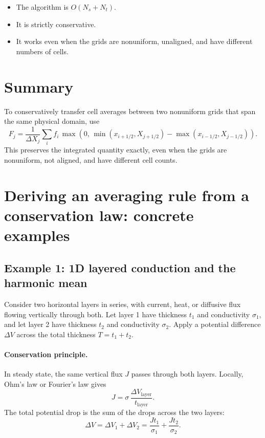 \documentclass[a4paper,10pt]{article}
\begin{document}
\begin{itemize}
\item The algorithm is $O(N_s + N_t)$.
\item It is strictly conservative.
\item It works even when the grids are nonuniform, unaligned, and have different numbers of cells.
\end{itemize}

\section{Summary}

To conservatively transfer cell averages between two nonuniform grids that span the same physical domain, use
\begin{equation}
F_j = \frac{1}{\Delta X_j} \sum_i f_i\, \max\!\left(0,\, \min(x_{i+1/2},X_{j+1/2}) - \max(x_{i-1/2},X_{j-1/2})\right).
\end{equation}
This preserves the integrated quantity exactly, even when the grids are nonuniform, not aligned, and have different cell counts.

\section{Deriving an averaging rule from a conservation law: concrete examples}

\subsection{Example 1: 1D layered conduction and the harmonic mean}

Consider two horizontal layers in series, with current, heat, or diffusive flux flowing vertically through both. Let layer 1 have thickness $t_1$ and conductivity $\sigma_1$, and let layer 2 have thickness $t_2$ and conductivity $\sigma_2$. Apply a potential difference $\Delta V$ across the total thickness $T=t_1+t_2$.

\paragraph{Conservation principle.} In steady state, the same vertical flux $J$ passes through both layers. Locally, Ohm's law or Fourier's law gives
\[
J = \sigma\,\frac{\Delta V_{\text{layer}}}{t_{\text{layer}}}.
\]
The total potential drop is the sum of the drops across the two layers:
\begin{equation}
\Delta V = \Delta V_1 + \Delta V_2 = \frac{J t_1}{\sigma_1} + \frac{J t_2}{\sigma_2}.
\end{equation}
\end{document}
